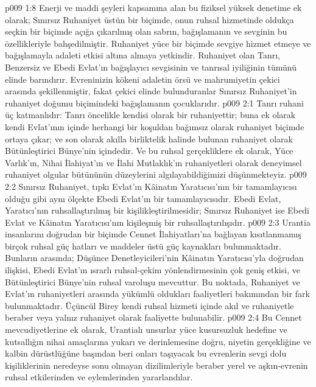 \vs p009 1:8 Enerji ve maddi şeyleri kapsamına alan bu fiziksel yüksek denetime ek olarak; Sınırsız Ruhaniyet üstün bir biçimde, onun ruhsal hizmetinde oldukça seçkin bir biçimde açığa çıkarılmış olan sabrın, bağışlamanın ve sevginin bu özellikleriyle bahşedilmiştir. Ruhaniyet yüce bir biçimde sevgiye hizmet etmeye ve bağışlamayla adaleti etkisi altına almaya yetkindir. Ruhaniyet olan Tanrı, Benzersiz ve Ebedi Evlat’ın bağışlayıcı sevgisinin ve tanrısal iyiliğinin tümünü elinde barındırır. Evreninizin kökeni adaletin örsü ve mahrumiyetin çekici arasında şekillenmiştir, fakat çekici elinde bulunduranlar Sınırsız Ruhaniyet’in ruhaniyet doğumu biçimindeki bağışlamanın çocuklarıdır.
\vs p009 2:1 Tanrı ruhani üç katmanlıdır: Tanrı öncelikle kendisi olarak bir ruhaniyettir; buna ek olarak kendi Evlat’ının içinde herhangi bir koşuldan bağımsız olarak ruhaniyet biçimde ortaya çıkar; ve son olarak akılla birliktelik halinde bulunan ruhaniyet olarak Bütünleştirici Bünye’nin içindedir. Ve bu ruhsal gerçekliklere ek olarak, Yüce Varlık’ın, Nihai İlahiyat’ın ve İlahi Mutlaklık’ın ruhaniyetleri olarak deneyimsel ruhaniyet olgular bütününün düzeylerini algılayabildiğimizi düşünmekteyiz.
\vs p009 2:2 Sınırsız Ruhaniyet, tıpkı Evlat’ın Kâinatın Yaratıcısı’nın bir tamamlayıcısı olduğu gibi aynı ölçekte Ebedi Evlat’ın bir tamamlayıcısıdır. Ebedi Evlat, Yaratıcı’nın ruhsallaştırılmış bir kişilikleştirilmesidir; Sınırsız Ruhaniyet ise Ebedi Evlat ve Kâinatın Yaratıcısı’nın kişileşmiş bir ruhsallaştırılışıdır.
\vs p009 2:3 Urantia insanlarını doğrudan bir biçimde Cennet İlahiyatları’na bağlayan kısıtlanmamış birçok ruhsal güç hatları ve maddeler üstü güç kaynakları bulunmaktadır. Bunların arasında; Düşünce Denetleyicileri’nin Kâinatın Yaratıcısı’yla doğrudan ilişkisi, Ebedi Evlat’ın ısrarlı ruhsal\hyp{}çekim yönlendirmesinin çok geniş etkisi, ve Bütünleştirici Bünye’nin ruhsal varoluşu mevcuttur. Bu noktada, Ruhaniyet ve Evlat’ın ruhaniyetleri arasında yükümlü oldukları faaliyetleri bakımından bir fark bulunmaktadır. Üçüncül Birey kendi ruhsal hizmeti içinde akıl ve ruhaniyetle beraber veya yalnız ruhaniyet olarak faaliyette bulunabilir.
\vs p009 2:4 Bu Cennet mevcudiyetlerine ek olarak, Urantialı unsurlar yüce kusursuzluk hedefine ve kutsallığın nihai amaçlarına yukarı ve derinlemesine doğru, niyetin gerçekliğine ve kalbin dürüstlüğüne başından beri onları taşıyacak bu evrenlerin sevgi dolu kişiliklerinin neredeyse sonu olmayan dizilimleriyle beraber yerel ve aşkın\hyp{}evrenin ruhsal etkilerinden ve eylemlerinden yararlandılar.
